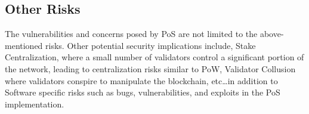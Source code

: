 \subsection{Other Risks}

The vulnerabilities and concerns posed by PoS are not limited to the above-mentioned risks. Other potential security implications include, Stake Centralization, where a small number of validators control a significant portion of the network, leading to centralization risks similar to PoW, Validator Collusion where validators conspire to manipulate the blockchain, etc\ldots in addition to Software specific risks such as bugs, vulnerabilities, and exploits in the PoS implementation.